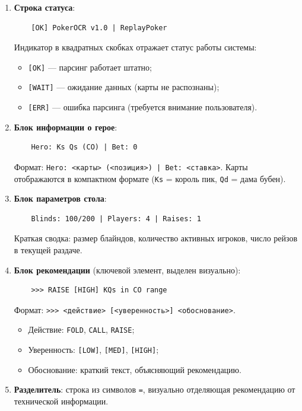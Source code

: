 \begin{enumerate}
    \item \textbf{Строка статуса}:
    \begin{verbatim}
    [OK] PokerOCR v1.0 | ReplayPoker
    \end{verbatim}
    Индикатор в квадратных скобках отражает статус работы системы:
    \begin{itemize}
        \item \texttt{[OK]} --- парсинг работает штатно;
        \item \texttt{[WAIT]} --- ожидание данных (карты не распознаны);
        \item \texttt{[ERR]} --- ошибка парсинга (требуется внимание пользователя).
    \end{itemize}
    
    \item \textbf{Блок информации о герое}:
    \begin{verbatim}
    Hero: Ks Qs (CO) | Bet: 0
    \end{verbatim}
    Формат: \texttt{Hero: <карты> (<позиция>) | Bet: <ставка>}. Карты отображаются в компактном формате (\texttt{Ks} = король пик, \texttt{Qd} = дама бубен).
    
    \item \textbf{Блок параметров стола}:
    \begin{verbatim}
    Blinds: 100/200 | Players: 4 | Raises: 1
    \end{verbatim}
    Краткая сводка: размер блайндов, количество активных игроков, число рейзов в текущей раздаче.
    
    \item \textbf{Блок рекомендации} (ключевой элемент, выделен визуально):
    \begin{verbatim}
    >>> RAISE [HIGH] KQs in CO range
    \end{verbatim}
    Формат: \texttt{>>> <действие> [<уверенность>] <обоснование>}.
    \begin{itemize}
        \item Действие: \texttt{FOLD}, \texttt{CALL}, \texttt{RAISE};
        \item Уверенность: \texttt{[LOW]}, \texttt{[MED]}, \texttt{[HIGH]};
        \item Обоснование: краткий текст, объясняющий рекомендацию.
    \end{itemize}
    
    \item \textbf{Разделитель}: строка из символов \texttt{=}, визуально отделяющая рекомендацию от технической информации.
\end{enumerate}

